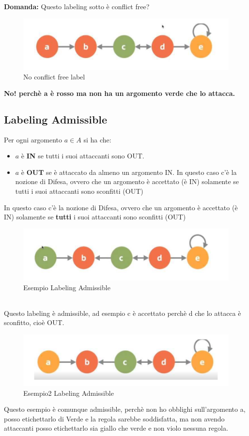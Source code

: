 \textbf{Domanda: } Questo labeling sotto è conflict free?
\begin{figure}[htp]
	\centering
    \includegraphics[width=12cm, keepaspectratio]{img/Cap7/CF3.png}
    \caption{No conflict free label}
\end{figure}
\begin{center}
    \textbf{No! perchè a è rosso ma non ha un argomento verde che lo attacca.}
\end{center}
\newpage
\subsection{Labeling Admissible}
Per ogni argomento $a \in A$ si ha che:
\begin{itemize}
    \item $a$ è \textbf{IN} se tutti i suoi attaccanti sono OUT.
    \item $a$ è \textbf{OUT} se è attaccato da almeno un argomento IN. In questo caso c’è la nozione di Difesa, ovvero che un argomento è accettato (è IN) solamente se tutti i suoi attaccanti sono sconfitti (OUT)
\end{itemize}
In questo caso c’è la nozione di Difesa, ovvero che un argomento è accettato (è IN) solamente se \textbf{tutti} i suoi attaccanti sono sconfitti (OUT)
\begin{figure}[htp]
	\centering
    \includegraphics[width=12cm, keepaspectratio]{img/Cap7/LA.png}
    \caption{Esempio Labeling Admissible}
\end{figure}
\\Questo labeling è admissible, ad esempio c è accettato perchè d che lo attacca è sconfitto, cioè OUT.
\begin{figure}[htp]
	\centering
    \includegraphics[width=12cm, keepaspectratio]{img/Cap7/LA2.png}
    \caption{Esempio2 Labeling Admissible}
\end{figure}
Questo esempio è comunque admissible, perchè non ho obblighi sull’argomento a, posso etichettarlo di Verde e la regola sarebbe soddisfatta, ma non avendo attaccanti posso etichettarlo sia giallo che verde e non violo nessuna regola.

